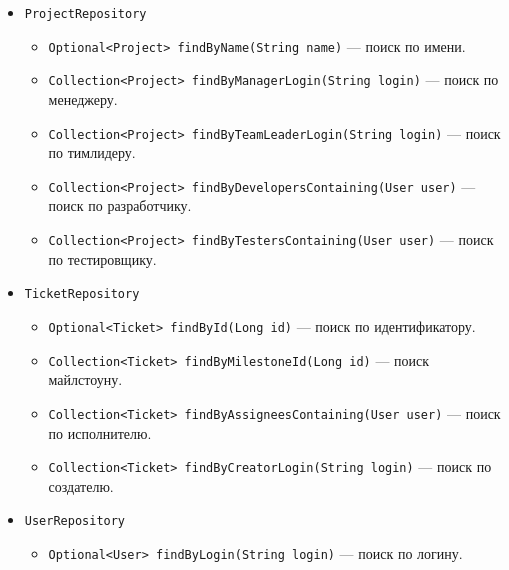 \begin{itemize}
		\item \texttt{ProjectRepository}
		\begin{itemize}
			\item \texttt{Optional<Project> findByName(String name)} --- поиск по имени.
			\item \texttt{Collection<Project> findByManagerLogin(String login)} --- поиск по менеджеру.
			\item \texttt{Collection<Project> findByTeamLeaderLogin(String login)} --- поиск по тимлидеру.
			\item \texttt{Collection<Project> findByDevelopersContaining(User user)} --- поиск по разработчику.
			\item \texttt{Collection<Project> findByTestersContaining(User user)} --- поиск по тестировщику.
		\end{itemize}
		
		\item \texttt{TicketRepository}
		\begin{itemize}
			\item \texttt{Optional<Ticket> findById(Long id)} --- поиск по идентификатору.
			\item \texttt{Collection<Ticket> findByMilestoneId(Long id)} --- поиск майлстоуну.
			\item \texttt{Collection<Ticket> findByAssigneesContaining(User user)} --- поиск по исполнителю.
			\item \texttt{Collection<Ticket> findByCreatorLogin(String login)} --- поиск по создателю.
		\end{itemize}
		
		\item \texttt{UserRepository}
		\begin{itemize}
			\item \texttt{Optional<User> findByLogin(String login)} --- поиск по логину.
		\end{itemize}
	\end{itemize}
	
